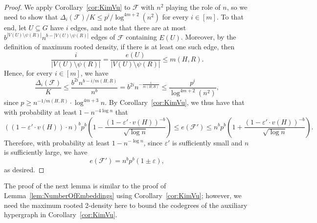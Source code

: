 \documentclass[11pt]{article}
\numberwithin{equation}{section}
\newcommand{\eps}{\varepsilon}
\newcounter{i}
\theoremstyle{plain}
\theoremstyle{plain} %
\theoremstyle{definition}
\newcommand{\cF}{\mathcal{F}}
\begin{document}
\begin{proof}
We apply Corollary~\ref{cor:KimVu} to $\cF$ with $n^2$ playing the role of $n$, so we need to show that $\Delta_i(\cF) / K \leq p^i /  \log^{4m+2}(n^2)$ for every $i \in [m]$.  
To that end, let $U \subseteq G$ have $i$ edges, and note that there are at most $b^{|V(U)\setminus \psi(R)|}n^{b - |V(U)\setminus \psi(R)|}$ edges of $\cF$ containing $E(U)$.  Moreover, by the definition of maximum rooted density, if there is at least one such edge, then
\begin{equation*}
    \frac{i}{|V(U)\setminus \psi(R)|} = \frac{e(U)}{|V(U)\setminus \psi(R)|} \le m(H,R).
\end{equation*}
Hence, for every $i \in [m]$, we have
\begin{equation*}
    \frac{\Delta_i(\cF)}{K} \leq \frac{b^{2i}n^{b - i/m(H,R)}}{n^b} = b^{2i} n^{-\frac{i}{m(H,R)}} \leq \frac{p^i}{\log^{4m+2}(n^2)},
\end{equation*}
since $p \geq n^{-1/m(H,R)} \cdot \log^{4m+3} n$.  
By Corollary~\ref{cor:KimVu}, we thus have that with probability at least $1-n^{-4\log n}$ that
\begin{equation*}
    ((1 - \eps'\cdot v(H))\cdot n)^b p^b\left(1 - \frac{(1 - \eps'\cdot v(H))^{-b}}{\sqrt{\log n}}\right) \leq e(\cF') \leq n^bp^b\left(1 + \frac{(1 - \eps'\cdot v(H))^{-b}}{\sqrt{\log n}}\right).
\end{equation*}
Therefore, with probability at least $1 - n^{-\log n}$, since $\eps'$ is sufficiently small and $n$ is sufficiently large, we have 
\begin{equation*}
    e(\cF') = n^bp^b(1 \pm \eps),
\end{equation*}
as desired.
\end{proof}

The proof of the next lemma is similar to the proof of Lemma~\ref{lem:NumberOfEmbeddings} using Corollary~\ref{cor:KimVu}; however, we need the maximum rooted 2-density here to bound the codegrees of the auxiliary hypergraph in Corollary~\ref{cor:KimVu}.
\end{document}
